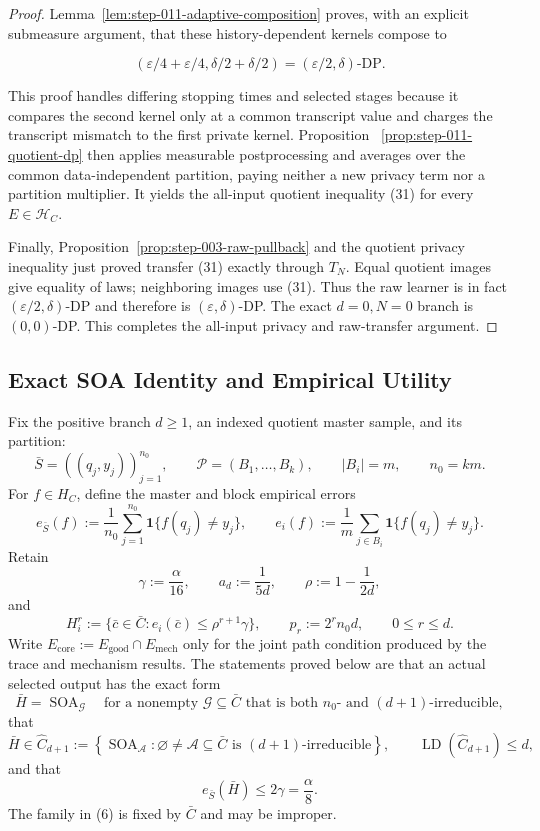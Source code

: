 \begin{proof}
Lemma~\ref{lem:step-011-adaptive-composition} proves, with an explicit
submeasure argument, that these history-dependent kernels compose to

\[
 (\varepsilon/4+\varepsilon/4,
   \delta/2+\delta/2)
 =(\varepsilon/2,\delta)\text{-DP}.
\]

This proof handles differing stopping times and selected stages because it
compares the second kernel only at a common transcript value and charges
the transcript mismatch to the first private kernel. Proposition
~\ref{prop:step-011-quotient-dp} then applies measurable postprocessing and
averages over the common data-independent partition, paying neither a new
privacy term nor a partition multiplier. It yields the all-input quotient
inequality (31) for every \(E\in\mathcal H_C\).

Finally, Proposition~\ref{prop:step-003-raw-pullback} and the quotient
privacy inequality just proved transfer (31) exactly through \(T_N\).
Equal quotient images give equality of laws; neighboring images use (31).
Thus the raw learner is in fact \((\varepsilon/2,\delta)\)-DP and therefore
is \((\varepsilon,\delta)\)-DP. The exact
\(d=0,N=0\) branch is \((0,0)\)-DP. This completes the all-input privacy
and raw-transfer argument.



\end{proof}

\subsection{Exact SOA Identity and Empirical Utility}\label{app:step_012}

Fix the positive branch \(d\ge1\), an indexed quotient master sample, and
its partition:
\[
 \bar S=((q_j,y_j))_{j=1}^{n_0},
 \qquad \mathcal P=(B_1,\ldots,B_k),
 \qquad |B_i|=m,
 \qquad n_0=km.
\tag{1}
\]
For \(f\in H_C\), define the master and block empirical errors
\[
 e_{\bar S}(f)
 :=\frac1{n_0}\sum_{j=1}^{n_0}
       \mathbf1\{f(q_j)\ne y_j\},
 \qquad
 e_i(f)
 :=\frac1m\sum_{j\in B_i}
       \mathbf1\{f(q_j)\ne y_j\}.
\tag{2}
\]
Retain
\[
 \gamma:=\frac{\alpha}{16},
 \qquad
 a_d:=\frac1{5d},
 \qquad
 \rho:=1-\frac1{2d},
\tag{3}
\]
and
\[
 H_i^r:=\{\bar c\in\bar C:
              e_i(\bar c)\leq\rho^{r+1}\gamma\},
 \qquad
 p_r:=2^rn_0d,
 \qquad 0\leq r\leq d.
\tag{4}
\]
Write \(E_{\mathrm{core}}:=E_{\mathrm{good}}\cap E_{\mathrm{mech}}\)
only for the joint path condition produced by the trace and mechanism
results.  The statements proved below are that an actual selected output
has the exact form
\[
 \bar H=\operatorname{SOA}_{\mathcal G}
 \quad\text{for a nonempty }\mathcal G\subseteq\bar C
 \text{ that is both }n_0\text{- and }(d+1)\text{-irreducible},
\tag{5}
\]
that
\[
 \bar H\in
 \widehat C_{d+1}
 :=\left\{\operatorname{SOA}_{\mathcal A}:
       \varnothing\ne\mathcal A\subseteq\bar C
       \text{ is }(d+1)\text{-irreducible}\right\},
 \qquad
 \operatorname{LD}(\widehat C_{d+1})\leq d,
\tag{6}
\]
and that
\[
 e_{\bar S}(\bar H)\leq2\gamma=\frac{\alpha}{8}.
\tag{7}
\]
The family in (6) is fixed by \(\bar C\) and may be improper.


